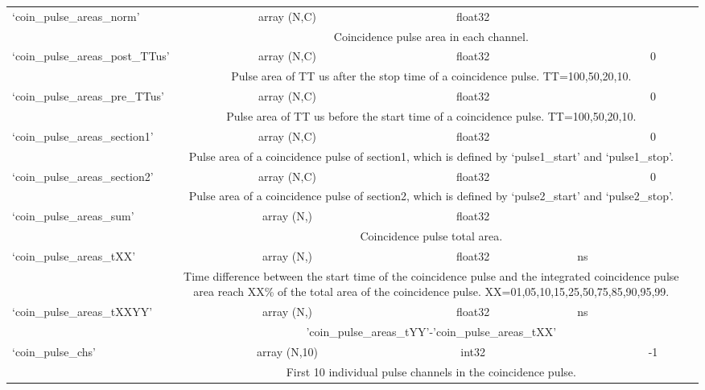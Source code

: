 \begin{center}
\begin{longtable}[!htbp]{|l||*{5}{c|}}
	 	`coin\_pulse\_areas\_norm' & array (N,C) & float32 &\si{\phe}& \si{\nan} \\\cline{2-6} & \multicolumn{4}{m{27em}|}{Coincidence pulse area in each channel.}\\\hline
	 	`coin\_pulse\_areas\_post\_TTus'& array (N,C) & float32 & \si{\phe} & 0 \\\cline{2-6} & \multicolumn{4}{m{27em}|}{Pulse area of TT us after the stop time of a coincidence pulse. TT=100,50,20,10. }\\\hline
	 	`coin\_pulse\_areas\_pre\_TTus' & array (N,C) & float32 & \si{\phe} & 0 \\\cline{2-6} & \multicolumn{4}{m{27em}|}{Pulse area of TT us before the start time of a coincidence pulse. TT=100,50,20,10.}\\\hline

	 	`coin\_pulse\_areas\_section1'& array (N,C) & float32 & \si{\phe} & 0 \\\cline{2-6} & \multicolumn{4}{m{27em}|}{Pulse area of a coincidence pulse of section1, which is defined by `pulse1\_start' and `pulse1\_stop'.}\\\hline
	 	`coin\_pulse\_areas\_section2'& array (N,C) & float32 & \si{\phe} & 0 \\\cline{2-6} & \multicolumn{4}{m{27em}|}{Pulse area of a coincidence pulse of section2, which is defined by `pulse2\_start' and `pulse2\_stop'.}\\\hline
	 	`coin\_pulse\_areas\_sum'& array (N,) & float32 & \si{\phe} & \si{\nan} \\\cline{2-6} & \multicolumn{4}{m{27em}|}{Coincidence pulse total area.}\\\hline
	 	`coin\_pulse\_areas\_tXX'& array (N,) & float32 & \si{\ns} & \si{\nan} \\\cline{2-6} & \multicolumn{4}{m{27em}|}{Time difference between the start time of the coincidence pulse and the integrated coincidence pulse area reach XX\% of the total area of the coincidence pulse. XX=01,05,10,15,25,50,75,85,90,95,99.}\\\hline
	 	`coin\_pulse\_areas\_tXXYY'& array (N,) & float32 & \si{\ns} & \si{\nan} \\\cline{2-6} & \multicolumn{4}{m{27em}|}{'coin\_pulse\_areas\_tYY'-'coin\_pulse\_areas\_tXX'}\\\hline
	 	`coin\_pulse\_chs'& array (N,10) & int32&& -1 \\\cline{2-6} & \multicolumn{4}{m{27em}|}{First 10 individual pulse channels in the coincidence pulse.}\\\hline

\end{longtable}
\end{center}
